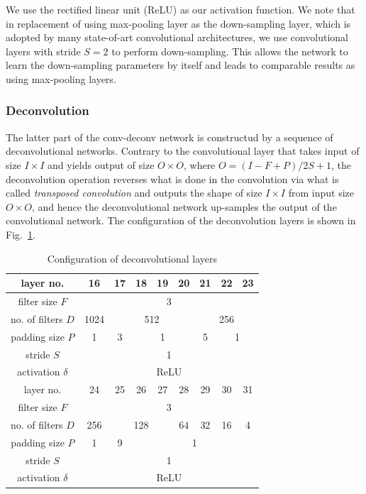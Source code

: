\documentclass{article}
\begin{document}
We use the rectified linear unit (ReLU) as our activation function\cite{nair2010rectified}. We note that in replacement of using max-pooling layer as the down-sampling layer, which is adopted by many state-of-art convolutional architectures\cite{krizhevsky2012imagenet,simonyan2014very,long2015fully,szegedy2015going}, we use convolutional layers with stride $S=2$ to perform down-sampling. This allows the network to learn the down-sampling parameters by itself and leads to comparable results as using max-pooling layers\cite{springenberg2014striving}.

\subsubsection{Deconvolution}
\label{ssub:deconv}
The latter part of the conv-deconv network is constructud by a sequence of deconvolutional networks. Contrary to the convolutional layer that takes input of size $I \times I$ and yields output of size $O \times O$, where $O = (I-F+P)/2S + 1$, the deconvolution operation reverses what is done in the convolution via what is called \emph{transposed convolution}\cite{dumoulin2016guide} and outputs the shape of size $I \times I$ from input size $O \times O$\cite{zeiler2014visualizing}, and hence the deconvolutional network up-samples the output of the convolutional network. The configuration of the deconvolution layers is shown in Fig.~\ref{tab:deconv_config}.
\begin{table}[htbp]
\center
\caption{Configuration of deconvolutional layers}
  \begin{tabular}{ c | c c c c c c c c}
    \hline
    layer no. & 16 & 17 & 18 & 19 & 20 & 21 & 22 & 23 \\
    \hline
    filter size $F$ & \multicolumn{8}{c}{3} \\
    \hline
    no. of filters $D$ & 1024 & \multicolumn{4}{|c|}{512} & \multicolumn{3}{c}{256} \\
    \hline
    padding size $P$ & 1 & \multicolumn{1}{|c|}{3} & \multicolumn{3}{c|}{1} & 5 & \multicolumn{2}{|c}{1} \\
    \hline
    stride $S$ & \multicolumn{8}{c}{1} \\
    \hline
    activation $\delta$ & \multicolumn{8}{c}{ReLU} \\
    \hline
    \hline
    layer no. & 24 & 25 & 26 & 27 & 28 & 29 & 30 & 31 \\
    \hline
    filter size $F$ & \multicolumn{8}{c}{3} \\
    \hline
    no. of filters $D$ & 256 & \multicolumn{3}{|c|}{128} & 64 & 32 & 16 & 4 \\
    \hline
    padding size $P$ & 1 & \multicolumn{1}{|c|}{9} & \multicolumn{6}{c}{1} \\
    \hline
    stride $S$ & \multicolumn{8}{c}{1} \\
    \hline
    activation $\delta$ & \multicolumn{8}{c}{ReLU} \\
    \hline
  \end{tabular}
  \label{tab:deconv_config}
\end{table}
\end{document}
